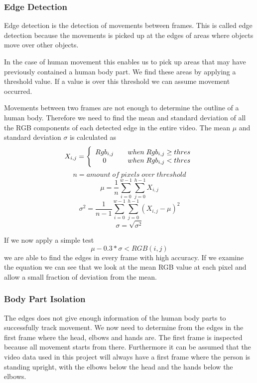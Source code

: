 \documentclass[a4paper,11pt,titlepage]{article}
\begin{document}
\subsubsection{Edge Detection}
Edge detection is the detection of movements between frames. This is called edge detection because the movements is picked up at the edges of areas where objects move over other objects.

In the case of human movement this enables us to pick up areas that may have previously contained a human body part. We find these areas by applying a threshold value. If a value is over this threshold we can assume movement occurred.

Movements between two frames are not enough to determine the outline of a human body. Therefore we need to find the mean and standard deviation of all the RGB components of each detected edge in the entire video. The mean $\mu$ and standard deviation $\sigma$ is calculated as
\begin{displaymath}
{X_{i,j}} =
\Bigg{\lbrace} \begin{array}{ccc}
Rgb_{i,j} & & when\;Rgb_{i,j} \geq thres \\
0 & & when\;Rgb_{i,j} < thres
\end{array} 
\end{displaymath}
\begin{displaymath}
n = amount\; of\; pixels\; over\; threshold
\end{displaymath}
\begin{displaymath}
\mu = \frac{1}{n} \sum_{i=0}^{w-1}\sum_{j=0}^{h-1} X_{i,j}
\end{displaymath}
\begin{displaymath}
\sigma^2 = \frac{1}{n - 1} \sum_{i=0}^{w-1}\sum_{j=0}^{h-1} (X_{i,j} - \mu)^2
\end{displaymath}
\begin{displaymath}
\sigma = \sqrt{\sigma^2}
\end{displaymath}

If we now apply a simple test
\begin{displaymath}
\mu - 0.3*\sigma < RGB(i,j)
\end{displaymath}
we are able to find the edges in every frame with high accuracy. If we examine the equation we can see that we look at the mean RGB value at each pixel and allow a small fraction of deviation from the mean.

\subsubsection{Body Part Isolation}
The edges does not give enough information of the human body parts to successfully track movement. We now need to determine from the edges in the first frame where the head, elbows and hands are. The first frame is inspected because all movement starts from there. Furthermore it can be assumed that the video data used in this project will always have a first frame where the person is standing upright, with the elbows below the head and the hands below the elbows.
\end{document}
